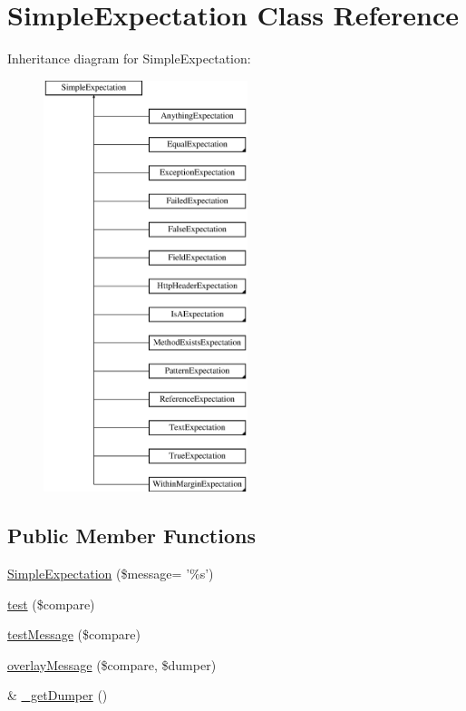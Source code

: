 \hypertarget{class_simple_expectation}{
\section{SimpleExpectation Class Reference}
\label{class_simple_expectation}
}
Inheritance diagram for SimpleExpectation:\begin{figure}[H]
\begin{center}
\leavevmode
\includegraphics[height=12.000000cm]{class_simple_expectation}
\end{center}
\end{figure}
\subsection*{Public Member Functions}
\begin{DoxyCompactItemize}
\item 
\hyperlink{class_simple_expectation_a77931c93ad58a8c51cda5a659628d705}{SimpleExpectation} (\$message= '\%s')
\item 
\hyperlink{class_simple_expectation_aa2b98f827e7487ebe12cedb9ad39d061}{test} (\$compare)
\item 
\hyperlink{class_simple_expectation_a15b69edf659c76f6543aa98d8d85b025}{testMessage} (\$compare)
\item 
\hyperlink{class_simple_expectation_afa9eddaa1f6818c6a3a6a89e3a36468a}{overlayMessage} (\$compare, \$dumper)
\item 
\& \hyperlink{class_simple_expectation_aed678acaf449c68f660730cefe4173c3}{\_\-getDumper} ()
\end{DoxyCompactItemize}
